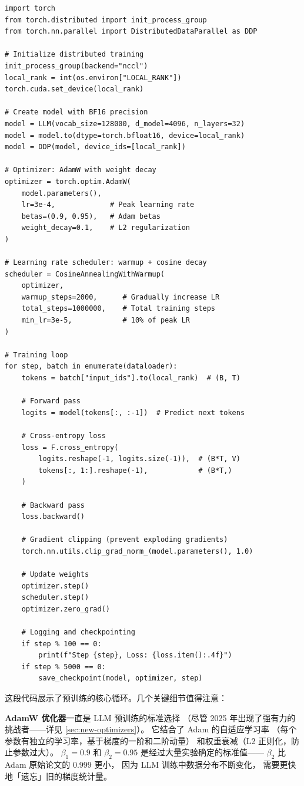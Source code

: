 \begin{lstlisting}[caption={Simplified LLM pre-training loop}]
import torch
from torch.distributed import init_process_group
from torch.nn.parallel import DistributedDataParallel as DDP

# Initialize distributed training
init_process_group(backend="nccl")
local_rank = int(os.environ["LOCAL_RANK"])
torch.cuda.set_device(local_rank)

# Create model with BF16 precision
model = LLM(vocab_size=128000, d_model=4096, n_layers=32)
model = model.to(dtype=torch.bfloat16, device=local_rank)
model = DDP(model, device_ids=[local_rank])

# Optimizer: AdamW with weight decay
optimizer = torch.optim.AdamW(
    model.parameters(),
    lr=3e-4,             # Peak learning rate
    betas=(0.9, 0.95),   # Adam betas
    weight_decay=0.1,    # L2 regularization
)

# Learning rate scheduler: warmup + cosine decay
scheduler = CosineAnnealingWithWarmup(
    optimizer,
    warmup_steps=2000,      # Gradually increase LR
    total_steps=1000000,    # Total training steps
    min_lr=3e-5,            # 10% of peak LR
)

# Training loop
for step, batch in enumerate(dataloader):
    tokens = batch["input_ids"].to(local_rank)  # (B, T)

    # Forward pass
    logits = model(tokens[:, :-1])  # Predict next tokens

    # Cross-entropy loss
    loss = F.cross_entropy(
        logits.reshape(-1, logits.size(-1)),  # (B*T, V)
        tokens[:, 1:].reshape(-1),            # (B*T,)
    )

    # Backward pass
    loss.backward()

    # Gradient clipping (prevent exploding gradients)
    torch.nn.utils.clip_grad_norm_(model.parameters(), 1.0)

    # Update weights
    optimizer.step()
    scheduler.step()
    optimizer.zero_grad()

    # Logging and checkpointing
    if step % 100 == 0:
        print(f"Step {step}, Loss: {loss.item():.4f}")
    if step % 5000 == 0:
        save_checkpoint(model, optimizer, step)
\end{lstlisting}

这段代码展示了预训练的核心循环。几个关键细节值得注意：

\textbf{AdamW 优化器}一直是 LLM 预训练的标准选择
（尽管 2025 年出现了强有力的挑战者——详见 \cref{sec:new-optimizers}）。
它结合了 Adam 的自适应学习率
（每个参数有独立的学习率，基于梯度的一阶和二阶动量）
和权重衰减（L2 正则化，防止参数过大）。
$\beta_1 = 0.9$ 和 $\beta_2 = 0.95$ 是经过大量实验确定的标准值——
$\beta_2$ 比 Adam 原始论文的 0.999 更小，
因为 LLM 训练中数据分布不断变化，
需要更快地「遗忘」旧的梯度统计量。

